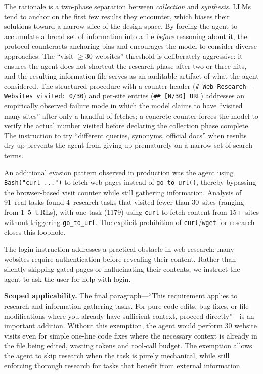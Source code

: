 \documentclass{article}
\begin{document}
\noindent The rationale is a two-phase separation between \emph{collection} and \emph{synthesis}.  LLMs tend to anchor on the first few results they encounter, which biases their solutions toward a narrow slice of the design space.  By forcing the agent to accumulate a broad set of information into a file \emph{before} reasoning about it, the protocol counteracts anchoring bias and encourages the model to consider diverse approaches.  The ``visit $\geq$30 websites'' threshold is deliberately aggressive: it ensures the agent does not shortcut the research phase after two or three hits, and the resulting information file serves as an auditable artifact of what the agent considered.  The structured procedure with a counter header (\texttt{\# Web Research --- Websites visited: 0/30}) and per-site entries (\texttt{\#\# [N/30] URL}) addresses an empirically observed failure mode in which the model claims to have ``visited many sites'' after only a handful of fetches; a concrete counter forces the model to verify the actual number visited before declaring the collection phase complete.  The instruction to try ``different queries, synonyms, official docs'' when results dry up prevents the agent from giving up prematurely on a narrow set of search terms.

An additional evasion pattern observed in production was the agent using \texttt{Bash("curl ...")} to fetch web pages instead of \texttt{go\_to\_url()}, thereby bypassing the browser-based visit counter while still gathering information.  Analysis of 91~real tasks found 4~research tasks that visited fewer than 30~sites (ranging from 1--5~URLs), with one task (1179) using \texttt{curl} to fetch content from 15+~sites without triggering \texttt{go\_to\_url}.  The explicit prohibition of \texttt{curl}/\texttt{wget} for research closes this loophole.

The login instruction addresses a practical obstacle in web research: many websites require authentication before revealing their content.  Rather than silently skipping gated pages or hallucinating their contents, we instruct the agent to ask the user for help with login.

\textbf{Scoped applicability.}  The final paragraph---``This requirement applies to research and information-gathering tasks.  For pure code edits, bug fixes, or file modifications where you already have sufficient context, proceed directly''---is an important addition.  Without this exemption, the agent would perform 30 website visits even for simple one-line code fixes where the necessary context is already in the file being edited, wasting tokens and tool-call budget.  The exemption allows the agent to skip research when the task is purely mechanical, while still enforcing thorough research for tasks that benefit from external information.
\end{document}
